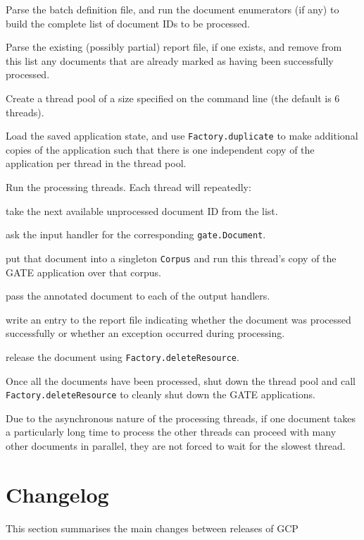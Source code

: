 \ben
\item Parse the batch definition file, and run the document enumerators (if
  any) to build the complete list of document IDs to be processed.
\item Parse the existing (possibly partial) report file, if one exists, and
  remove from this list any documents that are already marked as having been
  successfully processed.
\item Create a thread pool of a size specified on the command line (the default
  is 6 threads).
\item Load the saved application state, and use
  {\tt Factory.duplicate} to make additional copies of the application such
  that there is one independent copy of the application per thread in the
  thread pool.
\item Run the processing threads.  Each thread will repeatedly: 
  \bit
  \item take the next available unprocessed document ID from the list.
  \item ask the input handler for the corresponding \verb!gate.Document!.
  \item put that document into a singleton \verb!Corpus! and run this thread's
    copy of the GATE application over that corpus.
  \item pass the annotated document to each of the output handlers.
  \item write an entry to the report file indicating whether the document was
    processed successfully or whether an exception occurred during processing.
  \item release the document using \verb!Factory.deleteResource!.
  \eit
\item Once all the documents have been processed, shut down the thread pool and
  call \verb!Factory.deleteResource! to cleanly shut down the GATE
  applications.
\een

Due to the asynchronous nature of the processing threads, if one document takes
a particularly long time to process the other threads can proceed with many
other documents in parallel, they are not forced to wait for the slowest
thread.

\section{Changelog}\label{sec:intro:changes}

This section summarises the main changes between releases of GCP

